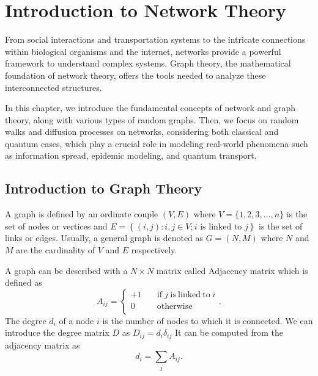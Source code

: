 \chapter{Introduction to Network Theory}\label{Network_Theory}

From social interactions and transportation systems to the intricate connections within biological organisms and the internet, networks provide a powerful framework to understand complex systems. Graph theory, the mathematical foundation of network theory, offers the tools needed to analyze these interconnected structures.

In this chapter, we introduce the fundamental concepts of network and graph theory, along with various types of random graphs.
Then, we focus on random walks and diffusion processes on networks, considering both classical and quantum cases, which play a crucial role in modeling real-world phenomena such as information spread, epidemic modeling, and quantum transport.


\section{Introduction to Graph Theory}


A graph is defined by an ordinate couple $(V,E)$ where $V = \{1,2,3, ...,n\}$ is the set of nodes or vertices and $E = \left\{ (i, j): i , j \in V ; i \text{ is linked to } j\right\}$ is the set of links or edges. Usually, a general graph is denoted as $G =(N,M)$ where $N$ and $M$ are the cardinality of $V$ and $E$ respectively.

A graph can be described with a $N\times N$ matrix called Adjacency matrix which is defined as
\begin{equation}
    A_{ij}= \left\{ \begin{aligned}
        +1 &\quad \mathrm{if} \; j \; \mathrm{is ~linked ~to} \; i \\
        0 &\quad \mathrm{otherwise} \\
    \end{aligned} \right.  .
\end{equation}
The degree $d_i$ of a node $i$ is the number of nodes to which it is connected. We can introduce the degree matrix $D$ as $D_{ij} = d_i\delta_{ij}$
It can be computed from the adjacency matrix as
\begin{equation}
    d_i = \sum_j A_{ij}.
\end{equation}

